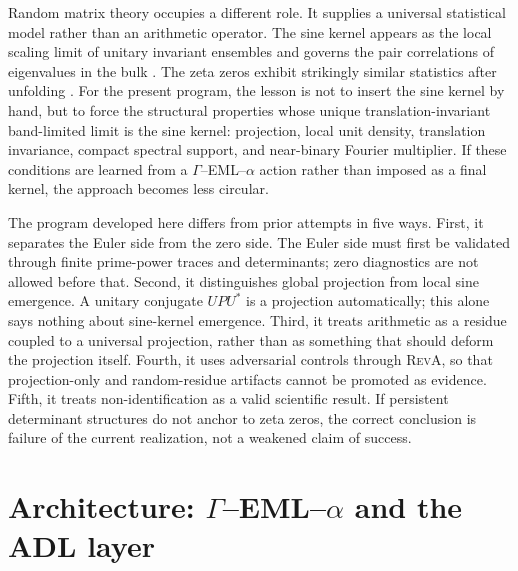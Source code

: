 \documentclass[11pt]{article}
\newcommand{\RevA}{\textsc{RevA}}
\theoremstyle{definition}
\theoremstyle{plain}
\begin{document}
Random matrix theory occupies a different role.  It supplies a universal statistical model rather than an arithmetic operator.  The sine kernel appears as the local scaling limit of unitary invariant ensembles and governs the pair correlations of eigenvalues in the bulk \citep{Mehta2004,Forrester2010}.  The zeta zeros exhibit strikingly similar statistics after unfolding \citep{Montgomery1973,Odlyzko1987}.  For the present program, the lesson is not to insert the sine kernel by hand, but to force the structural properties whose unique translation-invariant band-limited limit is the sine kernel: projection, local unit density, translation invariance, compact spectral support, and near-binary Fourier multiplier.  If these conditions are learned from a $\Gamma$--EML--$\alpha$ action rather than imposed as a final kernel, the approach becomes less circular.

The program developed here differs from prior attempts in five ways.  First, it separates the Euler side from the zero side.  The Euler side must first be validated through finite prime-power traces and determinants; zero diagnostics are not allowed before that.  Second, it distinguishes global projection from local sine emergence.  A unitary conjugate $UPU^*$ is a projection automatically; this alone says nothing about sine-kernel emergence.  Third, it treats arithmetic as a residue coupled to a universal projection, rather than as something that should deform the projection itself.  Fourth, it uses adversarial controls through \RevA{}, so that projection-only and random-residue artifacts cannot be promoted as evidence.  Fifth, it treats non-identification as a valid scientific result.  If persistent determinant structures do not anchor to zeta zeros, the correct conclusion is failure of the current realization, not a weakened claim of success.

\section{Architecture: $\Gamma$--EML--$\alpha$ and the ADL layer}
\end{document}
